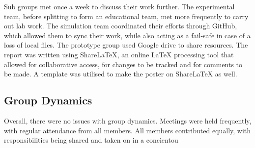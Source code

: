 Sub groups met once a week to discuss their work further. The experimental team, before splitting to form an educational team, met more frequently to carry out lab work. The simulation team coordinated their efforts through GitHub, which allowed them to sync their work, while also acting as a fail-safe in case of a loss of local files. The prototype group used Google drive to share resources. 
The report was written using ShareLaTeX, an online LaTeX processing tool that allowed for collaborative access, for changes to be tracked and for comments to be made. A template was utilised to make the poster on ShareLaTeX as well. 

\subsection{Group Dynamics}
Overall, there were no issues with group dynamics. Meetings were held frequently, with regular attendance from all members. All members contributed equally, with responsibilities being shared and taken on in a concientou 